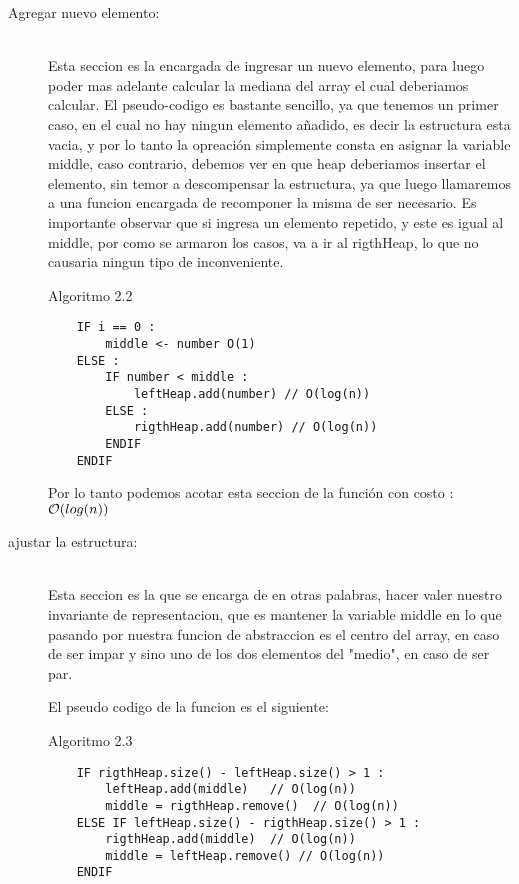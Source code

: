 \begin{description}
  \item[Agregar nuevo elemento:] \hfill \\
  Esta seccion es la encargada de ingresar un nuevo elemento, para luego poder mas adelante calcular la mediana del array el cual deberiamos calcular. El pseudo-codigo es bastante sencillo, ya que tenemos un primer caso, en el cual no hay ningun elemento a\~nadido, es decir la estructura esta vacia, y por lo tanto la opreaci\'on simplemente consta en asignar la variable middle, caso contrario, debemos ver en que heap deberiamos insertar el elemento, sin temor a descompensar la estructura, ya que luego llamaremos a una funcion encargada de recomponer la misma de ser necesario.
Es importante observar que si ingresa un elemento repetido, y este es igual al middle, por como se armaron los casos, va a ir al rigthHeap, lo que no causaria ningun tipo de inconveniente. 


\begin{description}
    Algoritmo 2.2
  \begin{verbatim}
    IF i == 0 :
        middle <- number O(1) 
    ELSE :
        IF number < middle :
            leftHeap.add(number) // O(log(n))
        ELSE : 
            rigthHeap.add(number) // O(log(n))
        ENDIF 
    ENDIF
    \end{verbatim}
\end{description}
    
Por lo tanto podemos acotar esta seccion de la funci\'on con costo :  $\mathcal{O} (log(n))$
  \item[ajustar la estructura:] \hfill \\
  
  Esta seccion es la que se encarga de en otras palabras, hacer valer nuestro invariante de representacion, que es mantener la variable middle en lo que pasando por nuestra funcion de abstraccion es el centro del array, en caso de ser impar y sino uno de los dos elementos del "medio", en caso de ser par.
  
  El pseudo codigo de la funcion es el siguiente:

\begin{description}
    Algoritmo 2.3
  \begin{verbatim}
    IF rigthHeap.size() - leftHeap.size() > 1 :
        leftHeap.add(middle)   // O(log(n))
        middle = rigthHeap.remove()  // O(log(n)) 
    ELSE IF leftHeap.size() - rigthHeap.size() > 1 :
        rigthHeap.add(middle)  // O(log(n))
        middle = leftHeap.remove() // O(log(n))
    ENDIF
  \end{verbatim}
\end{description}
 

\end{description}

